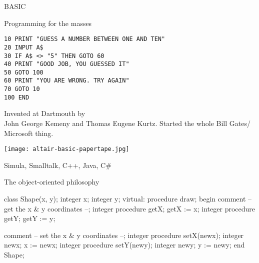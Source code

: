 \documentclass{plt}
\begin{document}
\begin{frame}[fragile]{BASIC}

\alert{Programming for the masses}

\begin{shadowblock}
\lstset{language=[Visual]Basic}
\begin{lstlisting}
10 PRINT "GUESS A NUMBER BETWEEN ONE AND TEN"
20 INPUT A$
30 IF A$ <> "5" THEN GOTO 60
40 PRINT "GOOD JOB, YOU GUESSED IT"
50 GOTO 100
60 PRINT "YOU ARE WRONG. TRY AGAIN"
70 GOTO 10
100 END
\end{lstlisting}
\end{shadowblock}

\parbox[b]{0.55\textwidth}{\raggedright
Invented at Dartmouth by \\John George Kemeny and Thomas
Eugene Kurtz.  Started the whole Bill Gates/ Microsoft thing.  
}%
\texttt{[image: altair-basic-papertape.jpg]}

\end{frame}

\begin{frame}[fragile]{Simula, Smalltalk, C++, Java, C\#}

\alert{The object-oriented philosophy}

\begin{shadedverbatim}
class Shape(x, y); integer x; integer y;
virtual: procedure draw;
begin
   comment -- get the x & y coordinates --;
   integer procedure getX;
      getX := x;
   integer procedure getY;
      getY := y;

   comment -- set the x & y coordinates --;
   integer procedure setX(newx); integer newx;
      x := newx;
   integer procedure setY(newy); integer newy;
      y := newy;
end Shape;
\end{shadedverbatim}
\end{frame}
\end{document}
